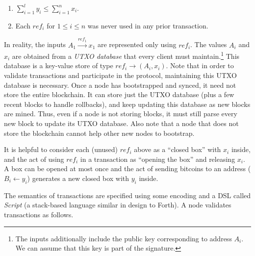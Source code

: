 \documentclass[]{report}   %
\newcommand{\sr}{\stackrel}
\newcommand{\ra}{\rightarrow}
\newcommand{\la}{\leftarrow}
\begin{document}
\begin{enumerate}
	\item $\sum_{i=1}^{l}y_i \leq \sum_{i=1}^{n}x_i$.
	\item Each $ref_i$ for $1\leq i\leq n$ was never used in any prior transaction.
\end{enumerate}

In reality, the inputs $A_1\sr{ref_1}{\ra}x_1$ are represented only using $ref_i$. The values $A_i$ and $x_i$ are obtained from a {\em UTXO database} that every client must maintain.\footnote{The inputs additionally include the public key corresponding to address $A_i$. We can assume that this key is part of the signature.} This database is a key-value store of type $ref_i \ra (A_i, x_i)$. Note that in order to validate transactions and participate in the protocol, maintaining this UTXO database is necessary. Once a node has bootstrapped and synced, it need not store the entire blockchain. It can store just the UTXO database (plus a few recent blocks to handle rollbacks), and keep updating this database as new blocks are mined. Thus, even if a node is not storing blocks, it must still parse every new block to update its UTXO database. Also note that a node that does not store the blockchain cannot help other new nodes to bootstrap.


It is helpful to consider each (unused) $ref_i$
above as a ``closed box'' with $x_i$ inside, and the act of using $ref_i$ in a transaction as ``opening the box'' and releasing $x_i$. A box can be opened at most once and the act of sending bitcoins to an address ($B_i\la y_i$) generates a new closed box with $y_i$ inside. 

The semantics of transactions are specified using some encoding and a DSL called {\em Script} (a stack-based language similar in design to Forth). 
A node validates transactions as follows.

\end{document}
